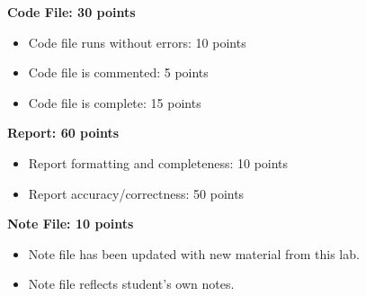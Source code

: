 \documentclass{article}
\begin{document}
\textbf{Code File: 30 points}
\begin{itemize}
    \item Code file runs without errors: 10 points
    \item Code file is commented: 5 points
    \item Code file is complete: 15 points
\end{itemize}

\textbf{Report: 60 points}
\begin{itemize}
    \item Report formatting and completeness: 10 points
    \item Report accuracy/correctness: 50 points
\end{itemize}

\textbf{Note File: 10 points}
\begin{itemize}
    \item Note file has been updated with new material from this lab.
    \item Note file reflects student's own notes.
\end{itemize}
\end{document}
